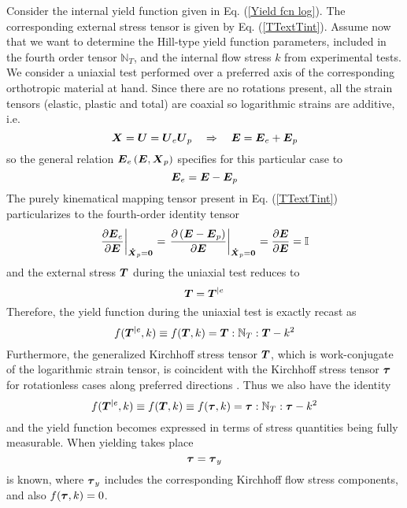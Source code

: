 \documentclass[preprint,review,12pt,sort&compress]{elsarticle}%
\newcommand{\xpdo}[0]{\scriptsize\mathbf{\dot X}_p = \mathbf{0}\normalsize\mathbf{}}
\renewcommand{\mathbf}[1]{\mbox{\boldmath $#1$ \unboldmath}  \!\!}
\begin{document}
Consider the internal yield function given in Eq. (\ref{Yield fcn log}). The
corresponding external stress tensor is given by Eq. (\ref{TTextTint}). Assume
now that we want to determine the Hill-type yield function parameters,
included in the fourth order tensor $\mathbb{N}_{T}$, and the internal flow
stress $k$ from experimental tests. We consider a uniaxial test performed over
a preferred axis of the corresponding orthotropic material at hand. Since
there are no rotations present, all the strain tensors (elastic, plastic and
total) are coaxial so logarithmic strains are additive, i.e.%
\begin{equation}
\mathbf{X}=\mathbf{U}=\mathbf{U}_{e}\mathbf{U}_{p}\quad\Rightarrow
\quad\mathbf{E}=\mathbf{E}_{e}+\mathbf{E}_{p}%
\end{equation}
so the general relation $\mathbf{E}_{e}\left(  \mathbf{E},\mathbf{X}%
_{p}\right)  $ specifies for this particular case to%
\begin{equation}
\mathbf{E}_{e}=\mathbf{E}-\mathbf{E}_{p}%
\end{equation}
The purely kinematical mapping tensor present in Eq. (\ref{TTextTint})
particularizes to the fourth-order identity tensor%
\begin{equation}
\left.  \frac{\partial\mathbf{E}_{e}}{\partial\mathbf{E}}\right\vert _{%
\xpdo
}=\left.  \frac{\partial\left(  \mathbf{E}-\mathbf{E}_{p}\right)  }%
{\partial\mathbf{E}}\right\vert _{%
\xpdo
}=\frac{\partial\mathbf{E}}{\partial\mathbf{E}}=\mathbb{I}%
\end{equation}
and the external stress $\mathbf{T}$ during the uniaxial test reduces to%
\begin{equation}
\mathbf{T}=\mathbf{T}^{|e}%
\end{equation}
Therefore, the yield function during the uniaxial test is exactly recast as%
\begin{equation}
f(\mathbf{T}^{|e},k)\equiv f(\mathbf{T},k)=\mathbf{T}:\mathbb{N}%
_{T}:\mathbf{T}-k^{2}%
\end{equation}
Furthermore, the generalized Kirchhoff stress tensor $\mathbf{T}$, which is
work-conjugate of the logarithmic strain tensor, is coincident with the
Kirchhoff stress tensor $\mathbf{\tau}$ for rotationless cases along preferred
directions \cite{LatMonAPM2016}. Thus we also have the identity%
\begin{equation}
f(\mathbf{T}^{|e},k)\equiv f(\mathbf{T},k)\equiv f(\mathbf{\tau}%
,k)=\mathbf{\tau}:\mathbb{N}_{T}:\mathbf{\tau}-k^{2} \label{Yield fcn tau}%
\end{equation}
and the yield function becomes expressed in terms of stress quantities being
fully measurable. When yielding takes place%
\begin{equation}
\mathbf{\tau}=\mathbf{\tau}_{y}%
\end{equation}
is known, where $\mathbf{\tau}_{y}$ includes the corresponding Kirchhoff flow
stress components, and also $f(\mathbf{\tau},k)=0$.
\end{document}
